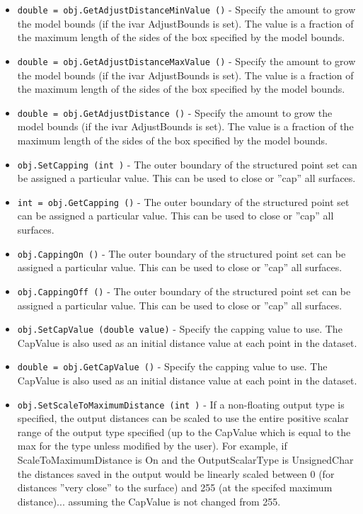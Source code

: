 \begin{itemize}
\item  \verb|double = obj.GetAdjustDistanceMinValue ()| -  Specify the amount to grow the model bounds (if the ivar AdjustBounds
 is set). The value is a fraction of the maximum length of the sides
 of the box specified by the model bounds.

\item  \verb|double = obj.GetAdjustDistanceMaxValue ()| -  Specify the amount to grow the model bounds (if the ivar AdjustBounds
 is set). The value is a fraction of the maximum length of the sides
 of the box specified by the model bounds.

\item  \verb|double = obj.GetAdjustDistance ()| -  Specify the amount to grow the model bounds (if the ivar AdjustBounds
 is set). The value is a fraction of the maximum length of the sides
 of the box specified by the model bounds.

\item  \verb|obj.SetCapping (int )| -  The outer boundary of the structured point set can be assigned a 
 particular value. This can be used to close or ''cap'' all surfaces.

\item  \verb|int = obj.GetCapping ()| -  The outer boundary of the structured point set can be assigned a 
 particular value. This can be used to close or ''cap'' all surfaces.

\item  \verb|obj.CappingOn ()| -  The outer boundary of the structured point set can be assigned a 
 particular value. This can be used to close or ''cap'' all surfaces.

\item  \verb|obj.CappingOff ()| -  The outer boundary of the structured point set can be assigned a 
 particular value. This can be used to close or ''cap'' all surfaces.

\item  \verb|obj.SetCapValue (double value)| -  Specify the capping value to use. The CapValue is also used as an
 initial distance value at each point in the dataset.

\item  \verb|double = obj.GetCapValue ()| -  Specify the capping value to use. The CapValue is also used as an
 initial distance value at each point in the dataset.

\item  \verb|obj.SetScaleToMaximumDistance (int )| -  If a non-floating output type is specified, the output distances can be
 scaled to use the entire positive scalar range of the output type 
 specified (up to the CapValue which is equal to the max for the type 
 unless modified by the user).  For example, if ScaleToMaximumDistance
 is On and the OutputScalarType is UnsignedChar the distances saved in the
 output would be linearly scaled between 0 (for distances ''very close'' to
 the surface) and 255 (at the specifed maximum distance)... assuming the 
 CapValue is not changed from 255.


\end{itemize}
